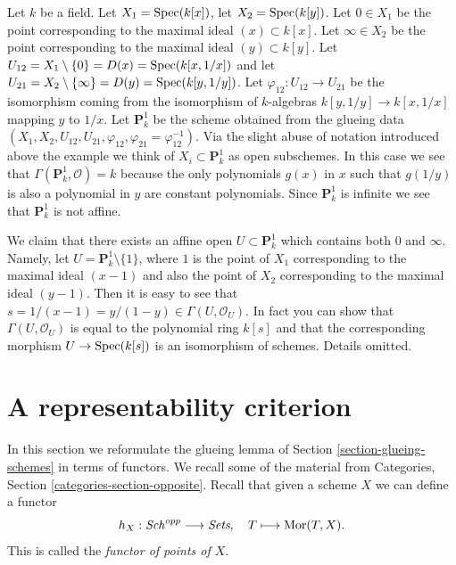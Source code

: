 \begin{example}
\label{example-projective-line}
Let $k$ be a field.
Let $X_1 = \mathop{\mathrm{Spec}}(k[x])$,
let $X_2 = \mathop{\mathrm{Spec}}(k[y])$.
Let $0 \in X_1$ be the point corresponding to the maximal ideal
$(x) \subset k[x]$.
Let $\infty \in X_2$ be the point corresponding to the maximal ideal
$(y) \subset k[y]$.
Let $U_{12} = X_1 \setminus \{0\} = D(x) = \mathop{\mathrm{Spec}}(k[x, 1/x])$ and
let $U_{21} = X_2 \setminus \{\infty\} = D(y) = \mathop{\mathrm{Spec}}(k[y, 1/y])$.
Let $\varphi_{12} : U_{12} \to U_{21}$ be the isomorphism
coming from the isomorphism of $k$-algebras
$k[y, 1/y] \to k[x, 1/x]$ mapping $y$ to $1/x$.
Let $\mathbf{P}^1_k$ be the scheme obtained from the glueing data
$(X_1, X_2, U_{12}, U_{21}, \varphi_{12},
\varphi_{21} = \varphi_{12}^{-1})$. Via the slight abuse
of notation introduced above the example we think of
$X_i \subset \mathbf{P}^1_k$ as open subschemes. In this case
we see that $\Gamma(\mathbf{P}^1_k, \mathcal{O}) = k$ because the
only polynomials $g(x)$ in $x$ such that $g(1/y)$ is
also a polynomial in $y$ are constant polynomials.
Since $\mathbf{P}^1_k$ is infinite we see that $\mathbf{P}^1_k$ is not affine.

\medskip\noindent
We claim that there exists an affine open $U \subset \mathbf{P}^1_k$
which contains both $0$ and $\infty$. Namely, let
$U = \mathbf{P}^1_k \setminus \{1\}$, where $1$ is the point
of $X_1$ corresponding to the maximal ideal $(x - 1)$
and also the point of $X_2$ corresponding to the
maximal ideal $(y - 1)$. Then it is easy to see that
$s = 1/(x - 1) = y/(1 - y) \in \Gamma(U, \mathcal{O}_U)$.
In fact you can show that $\Gamma(U, \mathcal{O}_U)$
is equal to the polynomial ring $k[s]$ and that the
corresponding morphism $U \to \mathop{\mathrm{Spec}}(k[s])$ is
an isomorphism of schemes. Details omitted.
\end{example}




\section{A representability criterion}
\label{section-representable}

\noindent
In this section we reformulate the glueing lemma
of Section \ref{section-glueing-schemes} in terms
of functors. We recall some of the material from
Categories, Section \ref{categories-section-opposite}.
Recall that given a scheme $X$ we
can define a functor
$$
h_X : \mathit{Sch}^{opp}
\longrightarrow
\textit{Sets}, \quad
T \longmapsto \mathop{\mathrm{Mor}}\nolimits(T, X).
$$
This is called the {\it functor of points of $X$}.

